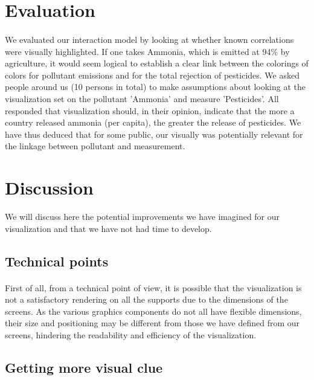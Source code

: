 \documentclass[preprint,journal]{vgtc}       %
\begin{document}
\section{Evaluation}

\paragraph{}
We evaluated our interaction model by looking at whether known correlations were visually highlighted.
If one takes Ammonia, which is emitted at 94\% by agriculture, it would seem logical to establish a clear link between the colorings of colors for pollutant emissions and for the total rejection of pesticides. We asked people around us (10 persons in total) to make assumptions about looking at the visualization set on the pollutant 'Ammonia' and measure 'Pesticides'. All responded that visualization should, in their opinion, indicate that the more a country released ammonia (per capita), the greater the release of pesticides. We have thus deduced that for some public, our visually was potentially relevant for the linkage between pollutant and measurement.

\section{Discussion}

We will discuss here the potential improvements we have imagined for our visualization and that we have not had time to develop. 

\subsection{Technical points}

\paragraph{}
First of all, from a technical point of view, it is possible that the visualization is not a satisfactory rendering on all the supports due to the dimensions of the screens. As the various graphics components do not all have flexible dimensions, their size and positioning may be different from those we have defined from our screens, hindering the readability and efficiency of the visualization. 


\subsection{Getting more visual clue}
\end{document}
